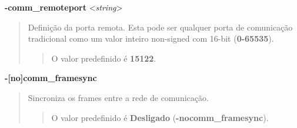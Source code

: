 \documentclass[letterpaper,10pt,brazil]{sphinxmanual}
\begin{document}
\label{commandline/commandline-all:mame-commandline-commremoteport}
\textbf{-comm\_remoteport} \textless{}\emph{string}\textgreater{}
\begin{quote}

Definição da porta remota. Esta pode ser qualquer porta de
comunicação tradicional como um valor inteiro non-signed com 16-bit
(\textbf{0-65535}).
\begin{quote}

O valor predefinido é \textbf{15122}.
\end{quote}
\end{quote}
\label{commandline/commandline-all:mame-commandline-commframesync}
\textbf{-{[}no{]}comm\_framesync}
\begin{quote}

Sincroniza os frames entre a rede de comunicação.
\begin{quote}

O valor predefinido é \textbf{Desligado} (\textbf{-nocomm\_framesync}).
\end{quote}
\end{quote}
\end{document}
